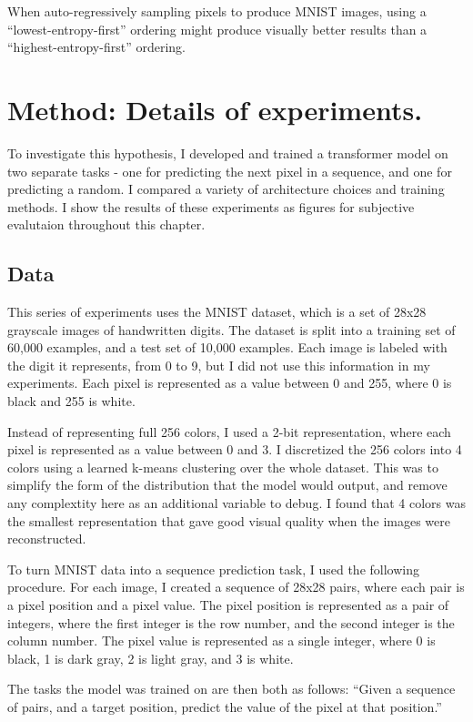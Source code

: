 When auto-regressively sampling pixels to produce MNIST images, using a ``lowest-entropy-first'' ordering might produce visually better results than a ``highest-entropy-first'' ordering.

\section{Method: Details of experiments.}

To investigate this hypothesis, I developed and trained a transformer model on two separate tasks - one for predicting the next pixel in a sequence, and one for predicting a random. I compared a variety of architecture choices and training methods. I show the results of these experiments as figures for subjective evalutaion throughout this chapter.

\subsection{Data}

This series of experiments uses the MNIST dataset, which is a set of 28x28 grayscale images of handwritten digits. The dataset is split into a training set of 60,000 examples, and a test set of 10,000 examples. Each image is labeled with the digit it represents, from 0 to 9, but I did not use this information in my experiments. Each pixel is represented as a value between 0 and 255, where 0 is black and 255 is white.

Instead of representing full 256 colors, I used a 2-bit representation, where each pixel is represented as a value between 0 and 3. I discretized the 256 colors into 4 colors using a learned k-means clustering over the whole dataset. This was to simplify the form of the distribution that the model would output, and remove any complextity here as an additional variable to debug. I found that 4 colors was the smallest representation that gave good visual quality when the images were reconstructed.

To turn MNIST data into a sequence prediction task, I used the following procedure. For each image, I created a sequence of 28x28 pairs, where each pair is a pixel position and a pixel value. The pixel position is represented as a pair of integers, where the first integer is the row number, and the second integer is the column number. The pixel value is represented as a single integer, where 0 is black, 1 is dark gray, 2 is light gray, and 3 is white.


The tasks the model was trained on are then both as follows: ``Given a sequence of pairs, and a target position, predict the value of the pixel at that position.''

